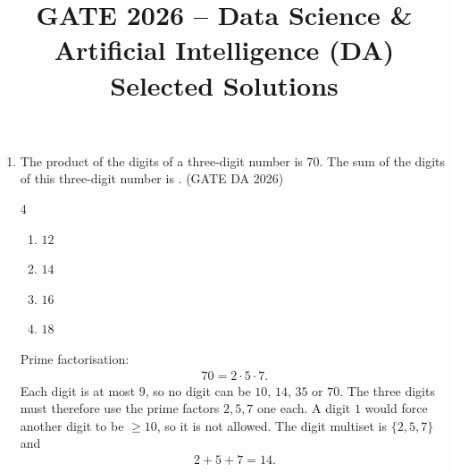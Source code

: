 

\lstset{language=Python,basicstyle=\ttfamily\small,breaklines=true,
        frame=single,columns=fullflexible}

\title{GATE 2026 -- Data Science \& Artificial Intelligence (DA)\\
Selected Solutions}
\author{}
\date{}


\maketitle

\begin{enumerate}[label=\textbf{Q.\arabic*},leftmargin=*,start=1]

\item[\textbf{Q.2}] The product of the digits of a three-digit number is $70$.
The sum of the digits of this three-digit number is \underline{\hspace{1.5cm}}.
\hfill (GATE DA 2026)
\begin{multicols}{4}
\begin{enumerate}[label=(\alph*),itemsep=0pt]
 \item $12$ \item $14$ \item $16$ \item $18$
\end{enumerate}
\end{multicols}
\solution
Prime factorisation:
\begin{align}
70 = 2\cdot 5\cdot 7 .
\end{align}
Each digit is at most $9$, so no digit can be $10$, $14$, $35$ or $70$. The
three digits must therefore use the prime factors $2,5,7$ one each. A digit
$1$ would force another digit to be $\ge 10$, so it is not allowed.
The digit multiset is $\{2,5,7\}$ and
\begin{align}
2+5+7 = 14 .
\end{align}


\end{enumerate}
